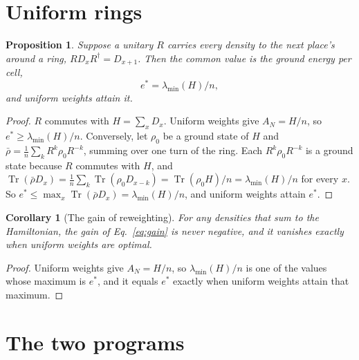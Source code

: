 \documentclass[aps,prd,reprint,superscriptaddress]{revtex4-2}
\newtheorem{proposition}{Proposition}
\newtheorem{corollary}{Corollary}
\begin{document}
\section{Uniform rings}
\label{app:uniform}

\begin{proposition}\label{prop:uniform}
Suppose a unitary $R$ carries every density to the next place's around a ring, $R D_x R^\dagger = D_{x+1}$. Then the common value is the ground energy per cell,
\begin{equation}
  e^* = \lambda_{\min}(H)/n ,
  \label{eq:uniform}
\end{equation}
and uniform weights attain it.
\end{proposition}
\begin{proof}
$R$ commutes with $H = \sum_x D_x$. Uniform weights give $A_N = H/n$, so $e^* \ge \lambda_{\min}(H)/n$. Conversely, let $\rho_0$ be a ground state of $H$ and $\bar\rho = \frac1n\sum_{k} R^k\rho_0 R^{-k}$, summing over one turn of the ring. Each $R^k\rho_0R^{-k}$ is a ground state because $R$ commutes with $H$, and $\operatorname{Tr}(\bar\rho D_x) = \frac1n\sum_k \operatorname{Tr}(\rho_0 D_{x-k}) = \operatorname{Tr}(\rho_0 H)/n = \lambda_{\min}(H)/n$ for every $x$. So $e^* \le \max_x \operatorname{Tr}(\bar\rho D_x) = \lambda_{\min}(H)/n$, and uniform weights attain $e^*$.
\end{proof}

\begin{corollary}[The gain of reweighting]\label{cor:gain}
For any densities that sum to the Hamiltonian, the gain of Eq.~\eqref{eq:gain} is never negative, and it vanishes exactly when uniform weights are optimal.
\end{corollary}
\begin{proof}
Uniform weights give $A_N = H/n$, so $\lambda_{\min}(H)/n$ is one of the values whose maximum is $e^*$, and it equals $e^*$ exactly when uniform weights attain that maximum.
\end{proof}

\section{The two programs}
\label{app:programs}
\end{document}
